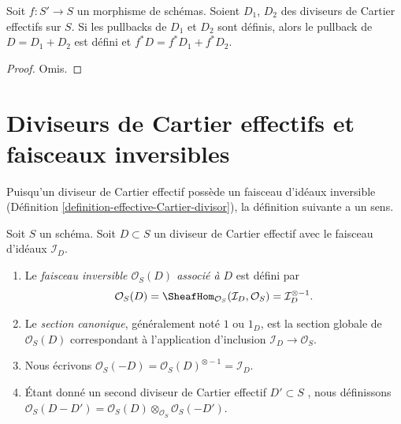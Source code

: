 \begin{lemma}
\label{lemma-pullback-effective-Cartier-divisors-additive}
Soit  $f : S' \to S$  un morphisme de schémas. Soient  $D_1$,  $D_2$  des
diviseurs de Cartier effectifs sur  $S$. Si les pullbacks de  $D_1$ 
et  $D_2$  sont définis, alors le pullback de  $D = D_1 + D_2$  est défini et
 $f^*D = f^*D_1 + f^*D_2$.
\end{lemma}

\begin{proof}
Omis.
\end{proof}





\section{Diviseurs de Cartier effectifs et faisceaux inversibles}
\label{section-effective-Cartier-invertible}

\noindent
Puisqu'un diviseur de Cartier effectif possède un faisceau d'idéaux inversible
(Définition  \ref{definition-effective-Cartier-divisor}), la définition suivante a un sens.

\begin{definition}
\label{definition-invertible-sheaf-effective-Cartier-divisor}
Soit  $S$  un schéma. Soit  $D \subset S$  un diviseur de Cartier effectif
avec le faisceau d'idéaux  $\mathcal{I}_D$.
\begin{enumerate}
\item Le  {\it faisceau inversible $\mathcal{O}_S(D)$ associé
à $D$} est défini par
$$
\mathcal{O}_S(D) =
\SheafHom_{\mathcal{O}_S}(\mathcal{I}_D, \mathcal{O}_S) =
\mathcal{I}_D^{\otimes -1}.
$$
\item Le  {\it section canonique}, généralement noté
 $1$  ou  $1_D$, est la section globale de  $\mathcal{O}_S(D)$ correspondant
à l'application d'inclusion $\mathcal{I}_D \to \mathcal{O}_S$.
\item Nous écrivons  $\mathcal{O}_S(-D) = \mathcal{O}_S(D)^{\otimes -1} = \mathcal{I}_D$.
\item Étant donné un second diviseur de Cartier effectif  $D' \subset S$ , nous définissons
 $\mathcal{O}_S(D - D') =
\mathcal{O}_S(D) \otimes_{\mathcal{O}_S} \mathcal{O}_S(-D')$.
\end{enumerate}
\end{definition}

